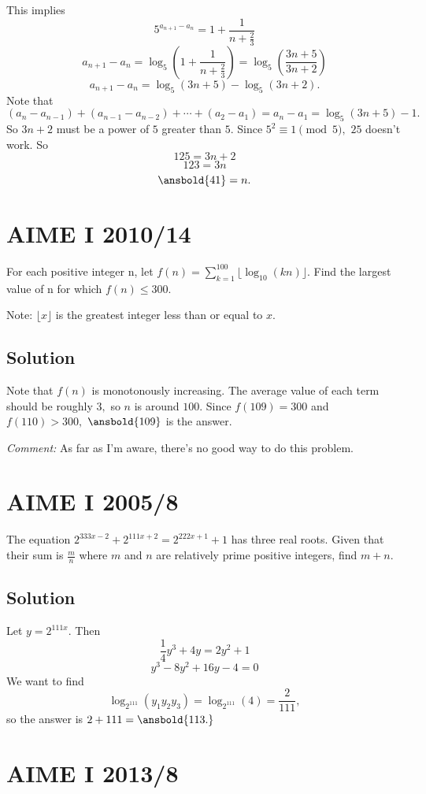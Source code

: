 \documentclass[mast]{lucky}
\begin{document}
This implies
    \[5^{a_{n+1}-a_n}=1+\frac{1}{n+\frac{2}{3}}\]
    \[a_{n+1}-a_n=\log_5(1+\frac{1}{n+\frac{2}{3}})=\log_5(\frac{3n+5}{3n+2})\]
    \[a_{n+1}-a_n=\log_5(3n+5)-\log_5(3n+2).\]
    Note that $(a_{n}-a_{n-1})+(a_{n-1}-a_{n-2})+\cdots+(a_{2}-a_{1})=a_n-a_1=\log_5(3n+5)-1.$ So $3n+2$ must be a power of $5$ greater than $5.$ Since $5^2\equiv 1\pmod{5},$ $25$ doesn't work. So
    \[125=3n+2\]
    \[123=3n\]
    \[\ansbold{41}=n.\]

\pagebreak\section{AIME I 2010/14}

For each positive integer n, let $f(n) = \sum_{k = 1}^{100} \lfloor \log_{10} (kn) \rfloor$. Find the largest value of n for which $f(n) \le 300$.

Note: $\lfloor x \rfloor$ is the greatest integer less than or equal to $x$.

\subsection{Solution}

Note that $f(n)$ is monotonously increasing. The average value of each term should be roughly $3,$ so $n$ is around $100.$ Since $f(109)=300$ and $f(110)>300,$ $\ansbold{109}$ is the answer.

\textit{Comment:} As far as I'm aware, there's no good way to do this problem.

\pagebreak\section{AIME I 2005/8}

The equation $2^{333x-2} + 2^{111x+2} = 2^{222x+1} + 1$ has three real roots. Given that their sum is $\frac mn$ where $m$ and $n$ are relatively prime positive integers, find $m+n.$

\subsection{Solution}

Let $y=2^{111x}.$ Then
    \[\frac{1}{4}y^3+4y=2y^2+1\]
    \[y^3-8y^2+16y-4=0\]
    We want to find
    \[\log_{2^{111}}({y_1y_2y_3})=\log_{2^{111}}({4})=\frac{2}{111},\]
    so the answer is $2+111=\ansbold{113.}$

\pagebreak\section{AIME I 2013/8}
\end{document}
